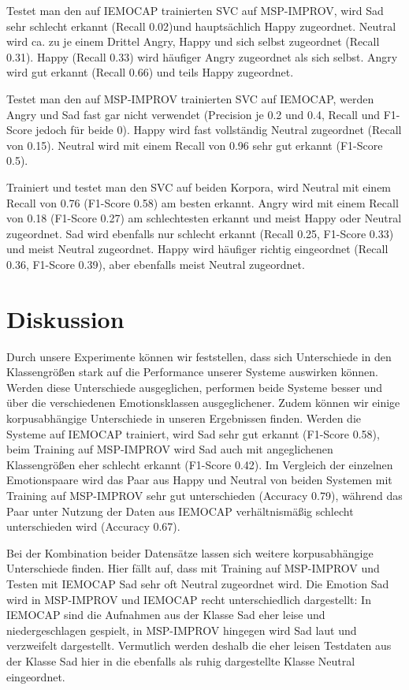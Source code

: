 \documentclass{article} %
\begin{document}
Testet man den auf IEMOCAP trainierten SVC auf MSP-IMPROV, wird Sad sehr schlecht erkannt (Recall 0.02)und hauptsächlich Happy zugeordnet. Neutral wird ca. zu je einem Drittel Angry, Happy und sich selbst zugeordnet (Recall 0.31). Happy (Recall 0.33) wird häufiger Angry zugeordnet als sich selbst. Angry wird gut erkannt (Recall 0.66) und teils Happy zugeordnet. 

Testet man den auf MSP-IMPROV trainierten SVC auf IEMOCAP, werden Angry und Sad fast gar nicht verwendet (Precision je 0.2 und 0.4, Recall und F1-Score jedoch für beide 0). Happy wird fast vollständig Neutral zugeordnet (Recall von 0.15). Neutral wird mit einem Recall von 0.96 sehr gut erkannt (F1-Score 0.5). 

Trainiert und testet man den SVC auf beiden Korpora, wird Neutral mit einem Recall von 0.76 (F1-Score 0.58) am besten erkannt. Angry wird mit einem Recall von 0.18 (F1-Score 0.27) am schlechtesten erkannt und meist Happy oder Neutral zugeordnet. Sad wird ebenfalls nur schlecht erkannt (Recall 0.25, F1-Score 0.33) und meist Neutral zugeordnet. Happy wird häufiger richtig eingeordnet (Recall 0.36, F1-Score 0.39), aber ebenfalls meist Neutral zugeordnet. 
\section{Diskussion}
Durch unsere Experimente können wir feststellen, dass sich Unterschiede in den Klassengrößen stark auf die Performance unserer Systeme auswirken können. Werden diese Unterschiede ausgeglichen, performen beide Systeme besser und über die verschiedenen Emotionsklassen ausgeglichener. Zudem können wir einige korpusabhängige Unterschiede in unseren Ergebnissen finden. Werden die Systeme auf IEMOCAP trainiert, wird Sad sehr gut erkannt (F1-Score 0.58), beim Training auf MSP-IMPROV wird Sad auch mit angeglichenen Klassengrößen eher schlecht erkannt (F1-Score 0.42). Im Vergleich der einzelnen Emotionspaare wird das Paar aus Happy und Neutral von beiden Systemen mit Training auf MSP-IMPROV sehr gut unterschieden (Accuracy 0.79), während das Paar unter Nutzung der Daten aus IEMOCAP verhältnismäßig schlecht unterschieden wird (Accuracy 0.67). 

Bei der Kombination beider Datensätze lassen sich weitere korpusabhängige Unterschiede finden. Hier fällt auf, dass mit Training auf MSP-IMPROV und Testen mit IEMOCAP Sad sehr oft Neutral zugeordnet wird. Die Emotion Sad wird in MSP-IMPROV und IEMOCAP recht unterschiedlich dargestellt: In IEMOCAP sind die Aufnahmen aus der Klasse Sad eher leise und niedergeschlagen gespielt, in MSP-IMPROV hingegen wird Sad laut und verzweifelt dargestellt. Vermutlich werden deshalb die eher leisen Testdaten aus der Klasse Sad hier in die ebenfalls als ruhig dargestellte Klasse Neutral eingeordnet. 
\end{document}
